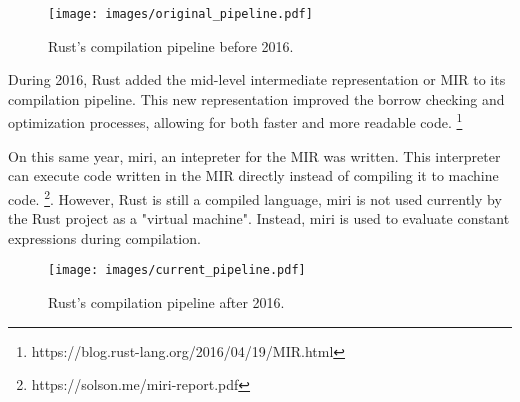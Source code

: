 \begin{figure}[ht]
  \centering
  \texttt{[image: images/original\_pipeline.pdf]}
  \caption{Rust's compilation pipeline before 2016.}
\end{figure}

During 2016, Rust added the mid-level intermediate representation or MIR to its compilation pipeline. This new representation improved the borrow checking and optimization processes, allowing for both faster and more readable code. \footnote{https://blog.rust-lang.org/2016/04/19/MIR.html} 

On this same year, miri, an intepreter for the MIR was written. This interpreter can execute code written in the MIR directly instead of compiling it to machine code. \footnote{https://solson.me/miri-report.pdf}. However, Rust is still a compiled language, miri is not used currently by the Rust project as a "virtual machine". Instead, miri is used to evaluate constant expressions during compilation.

\begin{figure}[ht]
  \centering
  \texttt{[image: images/current\_pipeline.pdf]}
  \caption{Rust's compilation pipeline after 2016.}
\end{figure}
